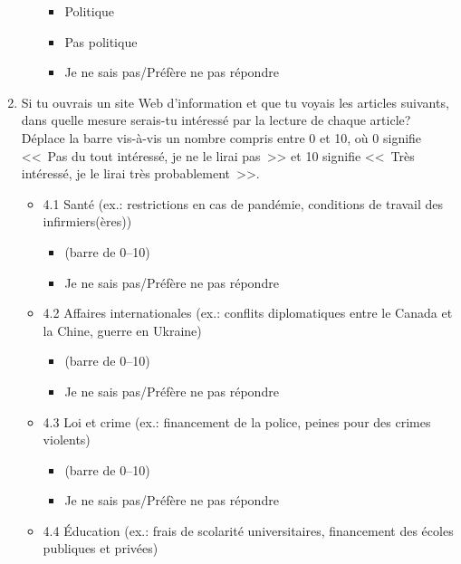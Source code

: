 \documentclass[
  letterpaper,
  DIV=11,
  numbers=noendperiod]{scrreprt}
\providecommand{\tightlist}{%
  \setlength{\itemsep}{0pt}\setlength{\parskip}{0pt}}\usepackage{longtable,booktabs,array}
\begin{document}
\begin{enumerate}
\begin{itemize}
    \begin{itemize}
    \tightlist
    \item
      Politique
    \item
      Pas politique
    \item
      Je ne sais pas/Préfère ne pas répondre
    \end{itemize}
  \end{itemize}
\item
  Si tu ouvrais un site Web d'information et que tu voyais les articles
  suivants, dans quelle mesure serais-tu intéressé par la lecture de
  chaque article? Déplace la barre vis-à-vis un nombre compris entre 0
  et 10, où 0 signifie \textless\textless~Pas du tout intéressé, je ne
  le lirai pas~\textgreater\textgreater{} et 10 signifie
  \textless\textless~Très intéressé, je le lirai très
  probablement~\textgreater\textgreater.

  \begin{itemize}
  \tightlist
  \item
    4.1 Santé (ex.: restrictions en cas de pandémie, conditions de
    travail des infirmiers(ères))

    \begin{itemize}
    \tightlist
    \item
      (barre de 0--10)
    \item
      Je ne sais pas/Préfère ne pas répondre
    \end{itemize}
  \item
    4.2 Affaires internationales (ex.: conflits diplomatiques entre le
    Canada et la Chine, guerre en Ukraine)

    \begin{itemize}
    \tightlist
    \item
      (barre de 0--10)
    \item
      Je ne sais pas/Préfère ne pas répondre
    \end{itemize}
  \item
    4.3 Loi et crime (ex.: financement de la police, peines pour des
    crimes violents)

    \begin{itemize}
    \tightlist
    \item
      (barre de 0--10)
    \item
      Je ne sais pas/Préfère ne pas répondre
    \end{itemize}
  \item
    4.4 Éducation (ex.: frais de scolarité universitaires, financement
    des écoles publiques et privées)


\end{itemize}
\end{enumerate}
\end{document}
